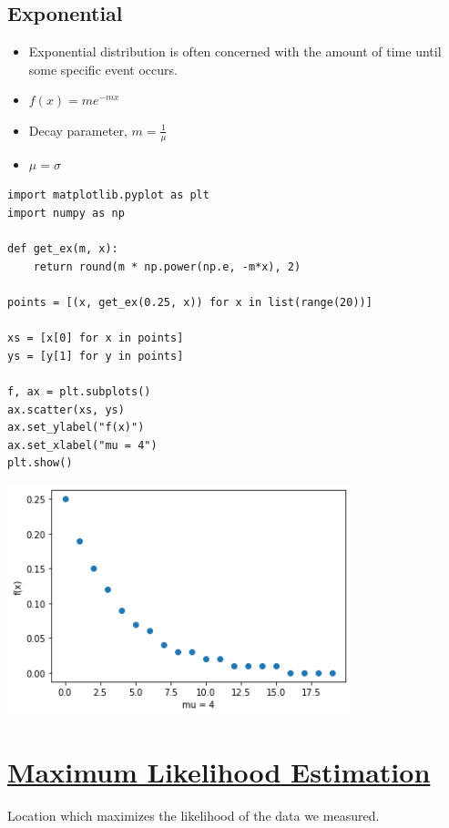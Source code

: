 \documentclass[11pt]{article}
\begin{document}
\subsection{Exponential}
\label{sec:org6fd6f0c}

\begin{itemize}
\item Exponential distribution is often concerned with the amount of time until some specific event occurs.
\item \(f(x) = me^{-mx}\)
\item Decay parameter, \(m = \frac{1}{\mu}\)
\item \(\mu = \sigma\)
\end{itemize}

\begin{verbatim}
import matplotlib.pyplot as plt
import numpy as np

def get_ex(m, x):
    return round(m * np.power(np.e, -m*x), 2)

points = [(x, get_ex(0.25, x)) for x in list(range(20))]

xs = [x[0] for x in points]
ys = [y[1] for y in points]

f, ax = plt.subplots()
ax.scatter(xs, ys)
ax.set_ylabel("f(x)")
ax.set_xlabel("mu = 4")
plt.show()
\end{verbatim}

\begin{center}
\includegraphics[width=10cm]{./obipy-resources/ZODX3e.png}
\end{center}

\section{\underline{Maximum Likelihood Estimation}}
\label{sec:orgcf5dcd8}

Location which maximizes the likelihood of the data we measured.
\end{document}
